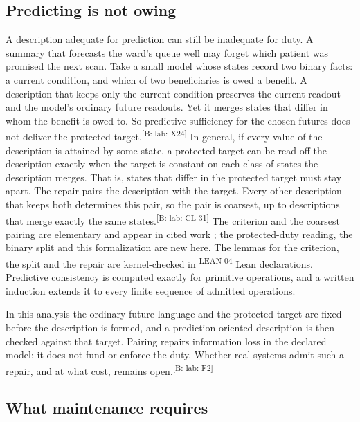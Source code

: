 \documentclass[pdflatex,sn-basic]{sn-jnl}%
\newcommand{\slot}[1]{}%
\newcommand{\claim}[2]{\ifannotated\textsuperscript{\textcolor{blue!60!black}{\tiny[#1: #2]}}\fi}
\newcommand{\rec}[1]{\ifannotated\textsuperscript{\textcolor{blue!60!black}{\tiny#1}}\fi}
\begin{document}
\subsection{Predicting is not owing}\label{sec:predict-owe}

\slot{4.2}
A description adequate for prediction can still be inadequate for duty. A summary that forecasts the ward's queue well may forget which patient was promised the next scan. Take a small model whose states record two binary facts: a current condition, and which of two beneficiaries is owed a benefit. A description that keeps only the current condition preserves the current readout and the model's ordinary future readouts. Yet it merges states that differ in whom the benefit is owed to. So predictive sufficiency for the chosen futures does not deliver the protected target.\claim{B: lab}{X24} In general, if every value of the description is attained by some state, a protected target can be read off the description exactly when the target is constant on each class of states the description merges. That is, states that differ in the protected target must stay apart. The repair pairs the description with the target. Every other description that keeps both determines this pair, so the pair is coarsest, up to descriptions that merge exactly the same states.\claim{B: lab}{CL-31} The criterion and the coarsest pairing are elementary and appear in cited work \citep{tsiokos2026f4,tsiokos2026f8}; the protected-duty reading, the binary split and this formalization are new here. The lemmas for the criterion, the split and the repair are kernel-checked in \numLeanCarrier\rec{LEAN-04} Lean declarations. Predictive consistency is computed exactly for primitive operations, and a written induction extends it to every finite sequence of admitted operations.

In this analysis the ordinary future language and the protected target are fixed before the description is formed, and a prediction-oriented description is then checked against that target. Pairing repairs information loss in the declared model; it does not fund or enforce the duty. Whether real systems admit such a repair, and at what cost, remains open.\claim{B: lab}{F2}

\subsection{What maintenance requires}\label{sec:gates}
\end{document}
